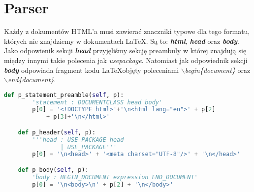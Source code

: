 \section{Parser}

Każdy z dokumentów HTML'a musi zawierać znaczniki typowe dla tego formatu, których nie znajdziemy w dokumentach \LaTeX. Są to: \textbf{\textit{html}},
\textbf{\textit{head}} oraz \textbf{\textit{body}}. Jako odpowienik sekcji \textbf{\textit{head}} przyjęliśmy sekcję preambuly w której 
znajdują się między innymi takie polecenia jak \textit{usepackage}. Natomiast jak odpowiednik sekcji \textbf{\textit{body}} odpowiada fragment kodu 
\LaTeX \space objęty poleceniami \textit{$\backslash$begin\{document\}} oraz \textit{$\backslash$end\{document\}}.

\begin{lstlisting}[language={Python}, caption={Preambuła}, label={gramatyka-preamble}]
    def p_statement_preamble(self, p):
        'statement : DOCUMENTCLASS head body'
        p[0] = '<!DOCTYPE html>'+'\n<html lang="en">' + p[2] 
            + p[3]+'\n</html>'

    def p_header(self, p):
        '''head : USE_PACKAGE head
                | USE_PACKAGE'''
        p[0] = '\n<head>' + '<meta charset="UTF-8"/>' + '\n</head>'

    def p_body(self, p):
        'body : BEGIN_DOCUMENT expression END_DOCUMENT'
        p[0] = '\n<body>\n' + p[2] + '\n</body>'
\end{lstlisting}











